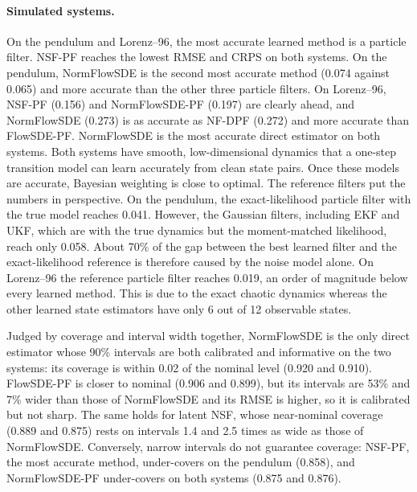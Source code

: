 \paragraph{Simulated systems.}
On the pendulum and Lorenz--96, the most accurate learned method is a particle filter. NSF-PF reaches the lowest RMSE and CRPS on both systems. On the pendulum, NormFlowSDE is the second most accurate method (0.074 against 0.065) and more accurate than the other three particle filters. On Lorenz--96, NSF-PF (0.156) and NormFlowSDE-PF (0.197) are clearly ahead, and NormFlowSDE (0.273) is as accurate as NF-DPF (0.272) and more accurate than FlowSDE-PF. NormFlowSDE is the most accurate direct estimator on both systems. Both systems have smooth, low-dimensional dynamics that a one-step transition model can learn accurately from clean state pairs. Once these models are accurate, Bayesian weighting is close to optimal. The reference filters put the numbers in perspective. On the pendulum, the exact-likelihood particle filter with the true model reaches 0.041. However, the Gaussian filters, including EKF and UKF, which are with the true dynamics but the moment-matched likelihood,  reach only 0.058. About 70\% of the gap between the best learned filter and the exact-likelihood reference is therefore caused by the noise model alone. On Lorenz--96 the reference particle filter reaches 0.019, an order of magnitude below every learned method. This is due to the exact chaotic dynamics whereas the other learned state estimators have only 6 out of 12 observable states. 

Judged by coverage and interval width together, NormFlowSDE is the only direct estimator whose 90\% intervals are both calibrated and informative on the two systems: its coverage is within 0.02 of the nominal level (0.920 and 0.910). FlowSDE-PF is closer to nominal (0.906 and 0.899), but its intervals are 53\% and 7\% wider than those of NormFlowSDE and its RMSE is higher, so it is calibrated but not sharp. The same holds for latent NSF, whose near-nominal coverage (0.889 and 0.875) rests on intervals 1.4 and 2.5 times as wide as those of NormFlowSDE. Conversely, narrow intervals do not guarantee coverage: NSF-PF, the most accurate method, under-covers on the pendulum (0.858), and NormFlowSDE-PF under-covers on both systems (0.875 and 0.876).

\begin{table}[htbp]
\centering\footnotesize
\resizebox{\linewidth}{!}{%

}
\caption{Test results on the robot datasets, in the format of Table~\ref{tab:results-sim}.}
\label{tab:results-robot}
\end{table}

